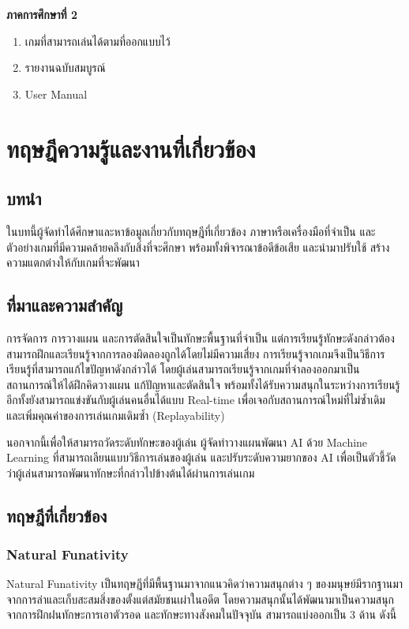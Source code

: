 \documentclass[12pt,oneside,openright,a4paper]{cpe-thai-project}
\begin{document}
\textbf{ภาคการศึกษาที่ 2}
\begin{enumerate}
  \item เกมที่สามารถเล่นได้ตามที่ออกแบบไว้
  \item รายงานฉบับสมบูรณ์
  \item User Manual
\end{enumerate}

\chapter{ทฤษฎีความรู้และงานที่เกี่ยวข้อง}

\section{บทนำ}
ในบทนี้ผู้จัดทำได้ศึกษาและหาข้อมูลเกี่ยวกับทฤษฎีที่เกี่ยวข้อง 
ภาษาหรือเครื่องมือที่จำเป็น และตัวอย่างเกมที่มีความคล้ายคลึงกับสิ่งที่จะศึกษา 
พร้อมทั้งพิจารณาข้อดีข้อเสีย และนำมาปรับใช้ สร้างความแตกต่างให้กับเกมที่จะพัฒนา


\section{ที่มาและความสำคัญ}

การจัดการ การวางแผน และการตัดสินใจเป็นทักษะพื้นฐานที่จำเป็น 
แต่การเรียนรู้ทักษะดังกล่าวต้องสามารถฝึกและเรียนรู้จากการลองผิดลองถูกได้โดยไม่มีความเสี่ยง 
การเรียนรู้จากเกมจึงเป็นวิธีการเรียนรู้ที่สามารถแก้ไขปัญหาดังกล่าวได้ 
โดยผู้เล่นสามารถเรียนรู้จากเกมที่จำลองออกมาเป็นสถานการณ์ให้ได้ฝึกคิดวางแผน 
แก้ปัญหาและตัดสินใจ พร้อมทั้งได้รับความสนุกในระหว่างการเรียนรู้ 
อีกทั้งยังสามารถแข่งขันกับผู้เล่นคนอื่นได้แบบ Real-time เพื่อเจอกับสถานการณ์ใหม่ที่ไม่ซ้ำเดิม 
และเพิ่มคุณค่าของการเล่นเกมเดิมซ้ำ (Replayability)

นอกจากนี้เพื่อให้สามารถวัดระดับทักษะของผู้เล่น ผู้จัดทำวางแผนพัฒนา AI ด้วย Machine Learning 
ที่สามารถเลียนแบบวิธีการเล่นของผู้เล่น และปรับระดับความยากของ AI 
เพื่อเป็นตัวชี้วัดว่าผู้เล่นสามารถพัฒนาทักษะที่กล่าวไปข้างต้นได้ผ่านการเล่นเกม


\section{ทฤษฎีที่เกี่ยวข้อง}

\subsection{Natural Funativity \cite{natfun05}}
Natural Funativity เป็นทฤษฎีที่มีพื้นฐานมาจากแนวคิดว่าความสนุกต่าง ๆ 
ของมนุษย์มีรากฐานมาจากการล่าและเก็บสะสมสิ่งของตั้งแต่สมัยชนเผ่าในอดีต 
โดยความสนุกนั้นได้พัฒนามาเป็นความสนุกจากการฝึกฝนทักษะการเอาตัวรอด
และทักษะทางสังคมในปัจจุบัน สามารถแบ่งออกเป็น 3 ด้าน ดังนี้
\end{document}
